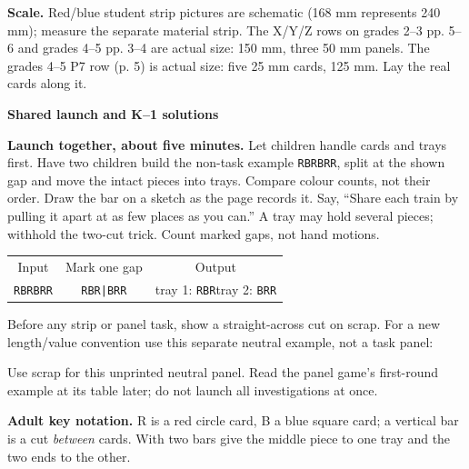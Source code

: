 \documentclass[11pt]{article}
\newcommand{\head}[1]{\par\textbf{\large #1}\par}
\newcommand{\seq}[1]{\texttt{#1}}
\begin{document}
\textbf{Scale.} Red/blue student strip pictures are schematic (168 mm represents 240 mm); measure the separate material strip. The X/Y/Z rows on grades 2--3 pp. 5--6 and grades 4--5 pp. 3--4 are actual size: 150 mm, three 50 mm panels. The grades 4--5 P7 row (p. 5) is actual size: five 25 mm cards, 125 mm. Lay the real cards along it.
\newpage
\head{Shared launch and K--1 solutions}
\textbf{Launch together, about five minutes.} Let children handle cards and trays first. Have two children build the non-task example \seq{RBRBRR}, split at the shown gap and move the intact pieces into trays. Compare colour counts, not their order. Draw the bar on a sketch as the page records it. Say, ``Share each train by pulling it apart at as few places as you can.'' A tray may hold several pieces; withhold the two-cut trick. Count marked gaps, not hand motions.
\begin{center}
\begin{tabular}{ccc}
Input & Mark one gap & Output\\[3pt]
\seq{RBRBRR} & \seq{RBR|BRR} & tray 1: \seq{RBR}\quad tray 2: \seq{BRR}
\end{tabular}
\end{center}
Before any strip or panel task, show a straight-across cut on scrap. For a new length/value convention use this separate neutral example, not a task panel:
\begin{center}
\end{center}
Use scrap for this unprinted neutral panel. Read the panel game's first-round example at its table later; do not launch all investigations at once.

\textbf{Adult key notation.} R is a red circle card, B a blue square card; a vertical bar is a cut \emph{between} cards. With two bars give the middle piece to one tray and the two ends to the other.
\end{document}
